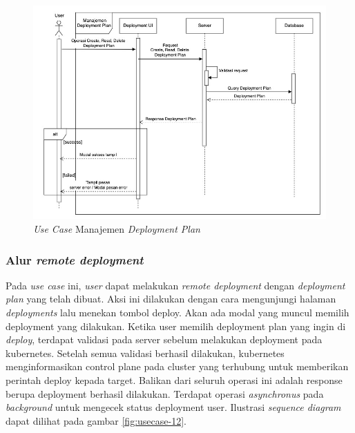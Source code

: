 \begin{figure}[ht]
  \centering
  \includegraphics[width=1\textwidth]{resources/chapter-3/usecase/uc-11.jpg}
  \caption{\textit{Use Case} Manajemen \textit{Deployment Plan}}
  \label{fig:usecase-11}
\end{figure}

\pagebreak

\subsubsection{Alur \textit{remote deployment}}

Pada \textit{use case} ini, \textit{user} dapat melakukan \textit{remote deployment} dengan \textit{deployment plan} yang telah dibuat. Aksi ini dilakukan dengan cara mengunjungi halaman \textit{deployments} lalu menekan tombol deploy. Akan ada modal yang muncul memilih deployment yang dilakukan. Ketika user memilih deployment plan yang ingin di \textit{deploy}, terdapat validasi pada server sebelum melakukan deployment pada kubernetes. Setelah semua validasi berhasil dilakukan, kubernetes menginformasikan control plane pada cluster yang terhubung untuk memberikan perintah deploy kepada target. Balikan dari seluruh operasi ini adalah response berupa deployment berhasil dilakukan. Terdapat operasi \textit{asynchronus} pada \textit{background} untuk mengecek status deployment user. Ilustrasi \textit{sequence diagram} dapat dilihat pada gambar \ref{fig:usecase-12}.

